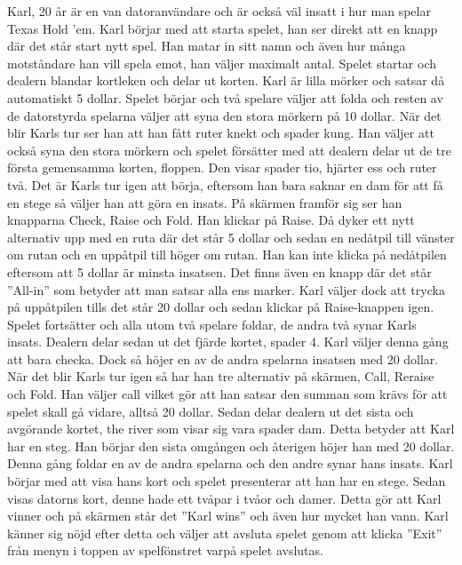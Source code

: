 \documentclass[10pt,twoside,a4paper]{article}
\begin{document}
\vspace{1em}
\noindent
Karl, 20 år är en van datoranvändare och är också väl insatt i hur man
spelar Texas Hold ’em. Karl börjar med att starta spelet, han ser direkt
att en knapp där det står start nytt spel. Han matar in sitt namn och även
hur många motståndare han vill spela emot, han väljer maximalt antal.
Spelet startar och dealern blandar kortleken och delar ut korten. Karl är
lilla mörker och satsar då automatiskt 5 dollar. Spelet börjar och två
spelare väljer att folda och resten av de datorstyrda spelarna väljer att
syna den stora mörkern på 10 dollar. När det blir Karls tur ser han att han
fått ruter knekt och spader kung. Han väljer att också syna den stora
mörkern och spelet försätter med att dealern delar ut de tre första
gemensamma korten, floppen. Den visar spader tio, hjärter ess och ruter
två. Det är Karls tur igen att börja, eftersom han bara saknar en dam för
att få en stege så väljer han att göra en insats. På skärmen framför sig
ser han knapparna Check, Raise och Fold. Han klickar på Raise. Då dyker ett
nytt alternativ upp med en ruta där det står 5 dollar och sedan en nedåtpil
till vänster om rutan och en uppåtpil till höger om rutan. Han kan inte
klicka på nedåtpilen eftersom att 5 dollar är minsta insatsen. Det finns
även en knapp där det står ”All-in” som betyder att man satsar alla ens
marker. Karl väljer dock att trycka på uppåtpilen tills det står 20 dollar
och sedan klickar på Raise-knappen igen. Spelet fortsätter och alla utom
två spelare foldar, de andra två synar Karls insats. Dealern delar sedan ut
det fjärde kortet, spader 4. Karl väljer denna gång att bara checka. Dock
så höjer en av de andra spelarna insatsen med 20 dollar. När det blir Karls
tur igen så har han tre alternativ på skärmen, Call, Reraise och Fold. Han
väljer call vilket gör att han satsar den summan som krävs för att spelet
skall gå vidare, alltså 20 dollar. Sedan delar dealern ut det sista och
avgörande kortet, the river som visar sig vara spader dam. Detta betyder
att Karl har en steg. Han börjar den sista omgången och återigen höjer han
med 20 dollar. Denna gång foldar en av de andra spelarna och den andre
synar hans insats. Karl börjar med att visa hans kort och spelet
presenterar att han har en stege. Sedan visas datorns kort, denne hade ett
tvåpar i tvåor och damer. Detta gör att Karl vinner och på skärmen står det
”Karl wins” och även hur mycket han vann. Karl känner sig nöjd efter detta
och väljer att avsluta spelet genom att klicka ”Exit” från menyn i toppen
av spelfönstret varpå spelet avslutas.
\end{document}
